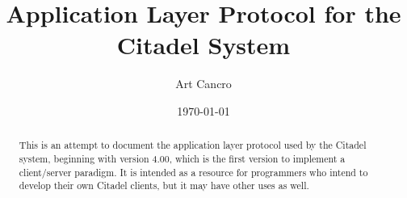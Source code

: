\documentclass{manual}
\title{Application Layer Protocol for the Citadel System}
\author{Art Cancro}
\date\today     %
\begin{document}
\maketitle

\begin{abstract}

\noindent


This is an attempt to document the application layer protocol used by the
Citadel system, beginning with version 4.00, which is the first version to
implement a client/server paradigm.  It is intended as a resource for
programmers who intend to develop their own Citadel clients, but it may have
other uses as well.

\end{abstract}






\end{document}
